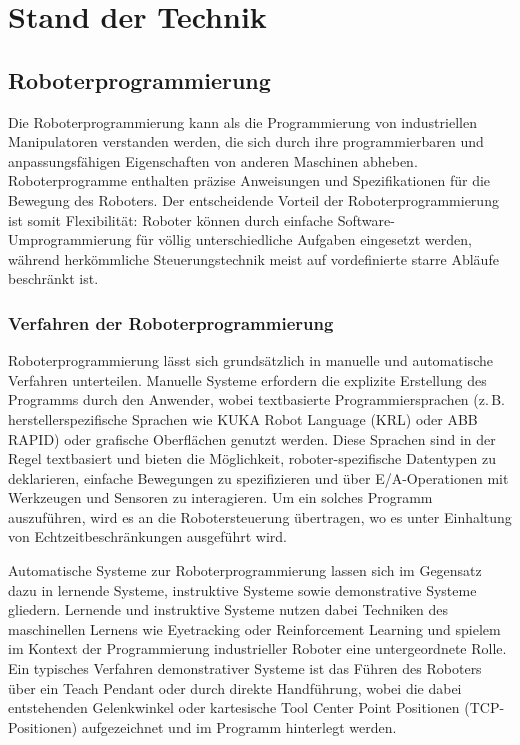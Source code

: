 \chapter{Stand der Technik} \label{cap:Grundlagen}

\section{Roboterprogrammierung}
Die Roboterprogrammierung kann als die
Programmierung von industriellen Manipulatoren verstanden werden, die sich durch
ihre programmierbaren und anpassungsfähigen Eigenschaften von anderen Maschinen
abheben. Roboterprogramme enthalten präzise Anweisungen und Spezifikationen für
die Bewegung des Roboters.  Der entscheidende
Vorteil der Roboterprogrammierung ist somit Flexibilität: Roboter
können durch einfache Software-Umprogrammierung für völlig unterschiedliche
Aufgaben eingesetzt werden, während herkömmliche Steuerungstechnik meist auf
vordefinierte starre Abläufe beschränkt ist.

\subsection{Verfahren der Roboterprogrammierung}
Roboterprogrammierung lässt sich grundsätzlich in manuelle und
automatische Verfahren unterteilen.
Manuelle Systeme erfordern die explizite Erstellung des Programms
durch den Anwender, wobei textbasierte Programmiersprachen (z.\,B.
  herstellerspezifische Sprachen wie KUKA Robot Language (KRL) oder ABB
RAPID) oder grafische Oberflächen genutzt werden. Diese Sprachen sind in der
Regel textbasiert und bieten die Möglichkeit, roboter-spezifische
Datentypen zu deklarieren, einfache Bewegungen zu spezifizieren und
über E/A-Operationen mit Werkzeugen
und Sensoren zu interagieren. Um ein solches Programm auszuführen,
wird es an die Robotersteuerung übertragen, wo es
unter Einhaltung von Echtzeitbeschränkungen ausgeführt
wird.

Automatische Systeme zur Roboterprogrammierung lassen sich im Gegensatz dazu in
lernende Systeme, instruktive Systeme sowie demonstrative Systeme
gliedern. Lernende und instruktive Systeme nutzen dabei Techniken des
maschinellen Lernens wie Eyetracking oder Reinforcement Learning und spielem im
Kontext der Programmierung industrieller Roboter eine untergeordnete
Rolle. Ein typisches Verfahren demonstrativer Systeme ist das
Führen des Roboters über ein Teach Pendant oder durch direkte
Handführung, wobei die dabei entstehenden Gelenkwinkel oder
kartesische Tool Center Point Positionen (TCP-Positionen)
aufgezeichnet und im Programm hinterlegt werden.

